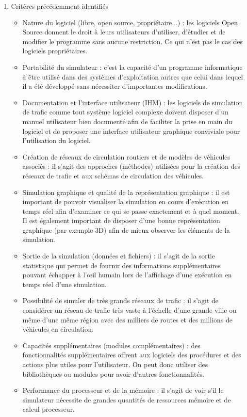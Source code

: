 \begin{enumerate}
    \item Critères précédemment identifiés
        \begin{itemize}
            \item Nature du logiciel (libre, open source, propriétaire...)  : les logiciels Open Source donnent le droit à leurs utilisateurs d’utiliser, d’étudier et de modifier le programme sans aucune restriction. Ce qui n'est pas le cas des logiciels propriétaires.
            \item Portabilité du simulateur : c'est la capacité d'un programme informatique à être utilisé dans des systèmes d'exploitation autres que celui dans lequel il a été développé sans nécessiter d'importantes modifications.
            \item Documentation et l'interface utilisateur (IHM) : les logiciels de simulation de trafic comme tout système logiciel complexe doivent disposer d'un manuel utilisateur bien documenté afin de faciliter la prise en main du logiciel et de proposer une interface utilisateur graphique conviviale pour l'utilisation du logiciel. 
            \item Création de réseaux de circulation routiers et de modèles de véhicules associés : il s'agit des approches (méthodes) utilisées pour la création des réseaux de trafic et aux schémas de circulation des véhicules.
            \item Simulation graphique et qualité de la représentation graphique : il est important de pouvoir visualiser la simulation en cours d'exécution en temps réel afin d'examiner ce qui se passe exactement et à quel moment. Il est également important de disposer d'une bonne représentation graphique (par exemple 3D) afin de mieux observer les éléments de la simulation. 
            \item Sortie de la simulation (données et fichiers) : il s'agit de la sortie statistique qui permet de fournir des informations supplémentaires pouvant échapper à l'œil humain lors de l'affichage d'une exécution en temps réel d'une simulation.
            \item Possibilité de simuler de très grands réseaux de trafic : il s'agit de considérer un réseau de trafic très vaste à l'échelle d'une grande ville ou même d'une même région avec des milliers de routes et des millions de véhicules en circulation.
            \item Capacités supplémentaires (modules complémentaires) : des fonctionnalités supplémentaires offrent aux logiciels des procédures et des actions plus utiles pour l'utilisateur. On peut donc utiliser des bibliothèques ou modules pour avoir d'autres fonctionnalités.
            \item Performance du processeur et de la mémoire : il s'agit de voir s'il le simulateur nécessite de grandes quantités de ressources mémoire et de calcul processeur.
        \end{itemize}
    

\end{enumerate}
